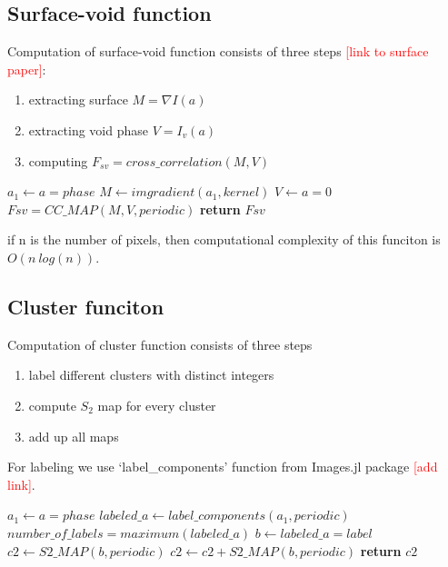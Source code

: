 \documentclass[reprint,amsmath,amssymb,aps,pre,showkeys,showpacs,nofootinbib]{revtex4-1}
\begin{document}
\subsection{Surface-void function}
Computation of surface-void function consists of three steps 
\textcolor{red}{[link to surface paper]}:
\begin{enumerate}
  \item extracting surface $M = \nabla I(a)$
  \item extracting void phase $V = I_v(a)$
  \item computing $F_{sv} = cross\_correlation(M, V)$
\end{enumerate}

\begin{algorithmic}[1]
    \State $a_1 \gets a = phase$
    \State $M \gets imgradient(a_1, kernel)$
    \State $V \gets a = 0$
    \State $Fsv = CC\_MAP(M, V, periodic)$
    \State \textbf{return} $Fsv$
  \EndProcedure
\end{algorithmic}

if n is the number of pixels, then computational complexity
of this funciton is $O(n\ log(n))$.

\subsection{Cluster funciton}

Computation of cluster function consists of three steps
\begin{enumerate}
  \item label different clusters with distinct integers
  \item compute $S_2$ map for every cluster
  \item add up all maps
\end{enumerate}

For labeling we use `label\_components' function from
Images.jl package \textcolor{red}{[add link]}.

\begin{algorithmic}[1]
    \State $a_1 \gets a = phase$
    \State $labeled\_a \gets label\_components(a_1, periodic)$
    \State $number\_of\_labels = maximum(labeled\_a)$
      \State $b \gets labeled\_a = label$
        \State $c2 \gets S2\_MAP(b, periodic)$
      \Else
        \State $c2 \gets c2 + S2\_MAP(b, periodic)$
      \EndIf
    \EndFor
    \State \textbf{return} $c2$
  \EndProcedure
\end{algorithmic}
\end{document}
